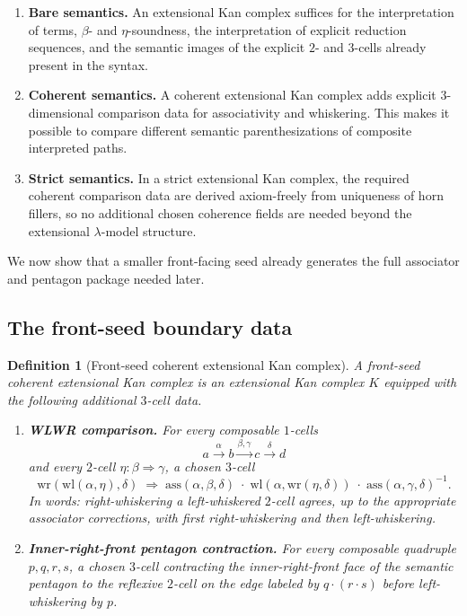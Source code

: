 \documentclass[webpdf,traditional,large,numbered]{oup-authoring-template}
\theoremstyle{thmstyleone}%
\theoremstyle{thmstyletwo}%
\theoremstyle{thmstylethree}%
\newtheorem{definition}[theorem]{Definition}
\newcommand{\whiskerLeft}{\mathrm{wl}}
\newcommand{\whiskerRight}{\mathrm{wr}}
\newcommand{\ass}{\mathrm{ass}}
\begin{document}
\begin{enumerate}[label=(\arabic*)]
  \item \textbf{Bare semantics.}
    An extensional Kan complex suffices for the interpretation of terms,
    $\beta$- and $\eta$-soundness, the interpretation of explicit reduction
    sequences, and the semantic images of the explicit $2$- and $3$-cells
    already present in the syntax.

  \item \textbf{Coherent semantics.}
    A coherent extensional Kan complex adds explicit $3$-dimensional comparison
    data for associativity and whiskering.  This makes it possible to compare
    different semantic parenthesizations of composite interpreted paths.

  \item \textbf{Strict semantics.}
    In a strict extensional Kan complex, the required coherent comparison data
    are derived axiom-freely from uniqueness of horn fillers, so no additional
    chosen coherence fields are needed beyond the extensional $\lambda$-model
    structure.
\end{enumerate}

We now show that a smaller front-facing seed already generates the full
associator and pentagon package needed later.

\subsection{The front-seed boundary data}

\begin{definition}[Front-seed coherent extensional Kan complex]
A \emph{front-seed coherent extensional Kan complex} is an extensional Kan
complex $K$ equipped with the following additional $3$-cell data.

\begin{enumerate}[label=(FS\arabic*)]
  \item \textbf{WLWR comparison.}
    For every composable $1$-cells
    \[
    a \xrightarrow{\alpha} b \xrightarrow{\beta,\gamma} c \xrightarrow{\delta} d
    \]
    and every $2$-cell $\eta:\beta\Rightarrow\gamma$, a chosen $3$-cell
    \[
    \whiskerRight(\whiskerLeft(\alpha,\eta),\delta)
    \;\Longrightarrow\;
    \ass(\alpha,\beta,\delta)\;\cdot\;
    \whiskerLeft(\alpha,\whiskerRight(\eta,\delta))\;\cdot\;
    \ass(\alpha,\gamma,\delta)^{-1}.
    \]
    In words: right-whiskering a left-whiskered $2$-cell agrees, up to the
    appropriate associator corrections, with first right-whiskering and then
    left-whiskering.

  \item \textbf{Inner-right-front pentagon contraction.}
    For every composable quadruple $p,q,r,s$, a chosen $3$-cell contracting the
    inner-right-front face of the semantic pentagon to the reflexive $2$-cell on
    the edge labeled by $q\cdot(r\cdot s)$ before left-whiskering by $p$.
\end{enumerate}
\end{definition}
\end{document}
